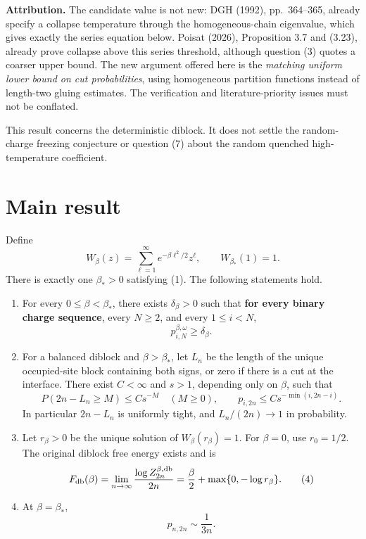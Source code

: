 \documentclass[11pt,a4paper]{report}
\begin{document}
\textbf{Attribution.} The candidate value is not new: DGH (1992), pp.~364--365, already specify a collapse temperature through the homogeneous-chain eigenvalue, which gives exactly the series equation below. Poisat (2026), Proposition 3.7 and (3.23), already prove collapse above this series threshold, although question (3) quotes a coarser upper bound. The new argument offered here is the \emph{matching uniform lower bound on cut probabilities}, using homogeneous partition functions instead of length-two gluing estimates. The verification and literature-priority issues must not be conflated.

This result concerns the deterministic diblock. It does not settle the random-charge freezing conjecture or question (7) about the random quenched high-temperature coefficient.

\section{Main result}

\begin{theorem}\label{thm:main}
Define
\[W_\beta(z)=\sum_{\ell=1}^{\infty}e^{-\beta\ell^2/2}z^\ell,
 \qquad W_{\beta_*}(1)=1.
 \tag{1}\]
There is exactly one \(\beta_*>0\) satisfying (1). The following statements hold.

\begin{enumerate}
\def\labelenumi{\arabic{enumi}.}
\tightlist
\item
  For every \(0\leq\beta<\beta_*\), there exists \(\delta_\beta>0\) such that \textbf{for every binary charge sequence}, every \(N\geq2\), and every \(1\leq i<N\),
  \[p_{i,N}^{\beta,\omega}\geq\delta_\beta.
  \tag{2}\]
\item
  For a balanced diblock and \(\beta>\beta_*\), let \(L_n\) be the length of the unique occupied-site block containing both signs, or zero if there is a cut at the interface. There exist \(C<\infty\) and \(s>1\), depending only on \(\beta\), such that
  \[P(2n-L_n\geq M)\leq C s^{-M}\quad(M\geq0),\qquad
  p_{i,2n}\leq C s^{-\min(i,2n-i)}.
  \tag{3}\]
  In particular \(2n-L_n\) is uniformly tight, and \(L_n/(2n)\to1\) in probability.
\item
  Let \(r_\beta>0\) be the unique solution of \(W_\beta(r_\beta)=1\). For \(\beta=0\), use \(r_0=1/2\). The original diblock free energy exists and is
  \[F_{\rm db}(\beta)=\lim_{n\to\infty}\frac{\log Z_{2n}^{\beta,\rm db}}{2n}
  =\frac\beta2+\max\{0,-\log r_\beta\}.
  \tag{4}\]
\item
  At \(\beta=\beta_*\),
  \[p_{n,2n}\sim\frac1{3n}.
  \tag{5}\]
\end{enumerate}
\end{theorem}
\end{document}
